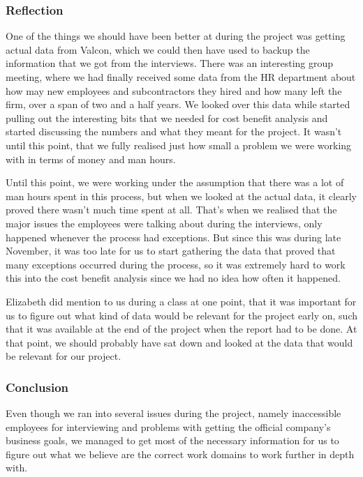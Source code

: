 \subsubsection*{Reflection}
One of the things we should have been better at during the project was getting actual data from Valcon, which we could then have used to backup the information that we got from the interviews. There was an interesting group meeting, where we had finally received some data from the HR department about how may new employees and subcontractors they hired and how many left the firm, over a span of two and a half years. We looked over this data while started pulling out the interesting bits that we needed for cost benefit analysis and started discussing the numbers and what they meant for the project. It wasn't until this point, that we fully realised just how small a problem we were working with in terms of money and man hours. 

Until this point, we were working under the assumption that there was a lot of man hours spent in this process, but when we looked at the actual data, it clearly proved there wasn't much time spent at all. That's when we realised that the major issues the employees were talking about during the interviews, only happened whenever the process had exceptions. But since this was during late November, it was too late for us to start gathering the data that proved that many exceptions occurred during the process, so it was extremely hard to work this into the cost benefit analysis since we had no idea how often it happened.

Elizabeth did mention to us during a class at one point, that it was important for us to figure out what kind of data would be relevant for the project early on, such that it was available at the end of the project when the report had to be done. At that point, we should probably have sat down and looked at the data that would be relevant for our project.

\subsubsection*{Conclusion}
Even though we ran into several issues during the project, namely inaccessible employees for interviewing and problems with getting the official company’s business goals, we managed to get most of the necessary information for us to figure out what we believe are the correct work domains to work further in depth with.